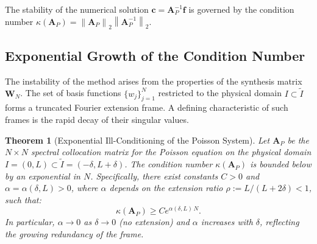 \documentclass[pdflatex,sn-mathphys-num]{sn-jnl}%
\theoremstyle{thmstyleone}%
\newtheorem{theorem}{Theorem}
\newcommand{\norm}[1]{\left\lVert#1\right\rVert}
\newcommand{\mat}[1]{\mathbf{#1}}
\newcommand{\vect}[1]{\mathbf{#1}}
\begin{document}
The stability of the numerical solution $\vect{c} = \mat{A}_P^{-1} \vect{f}$ is governed by the condition number $\kappa(\mat{A}_P) = \norm{\mat{A}_P}_2 \norm{\mat{A}_P^{-1}}_2$.

\subsection{Exponential Growth of the Condition Number}

The instability of the method arises from the properties of the synthesis matrix $\mat{W}_N$. The set of basis functions $\{w_j\}_{j=1}^N$ restricted to the physical domain $I \subset \tilde{I}$ forms a truncated Fourier extension frame. A defining characteristic of such frames is the rapid decay of their singular values.

% 

\begin{theorem}[Exponential Ill-Conditioning of the Poisson System]
\label{thm:poisson_illcond}
Let $\mat{A}_P$ be the $N \times N$ spectral collocation matrix for the Poisson equation on the physical domain $I = (0,L) \subset \tilde{I} = (-\delta, L+\delta)$. The condition number $\kappa(\mat{A}_P)$ is bounded below by an exponential in $N$. Specifically, there exist constants $C > 0$ and $\alpha = \alpha(\delta, L) > 0$, where $\alpha$ depends on the extension ratio $\rho := L/(L+2\delta) < 1$, such that:
\begin{equation}
\kappa(\mat{A}_P) \ge C e^{\alpha(\delta, L)\, N}.
\end{equation}
In particular, $\alpha \to 0$ as $\delta \to 0$ (no extension) and $\alpha$ increases with $\delta$, reflecting the growing redundancy of the frame.
\end{theorem}
\end{document}
